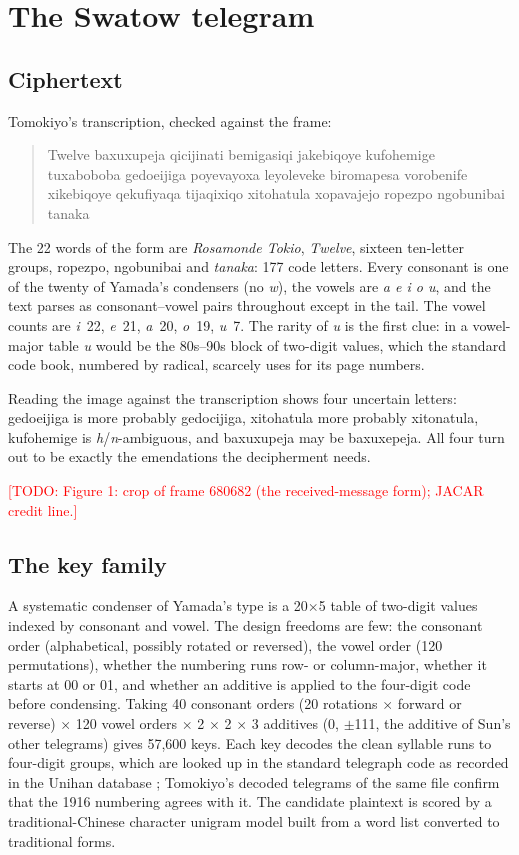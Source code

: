 \documentclass[11pt]{article}
\newcommand{\todo}[1]{\textcolor{red}{[TODO: #1]}}
\newcommand{\ct}[1]{\textsf{#1}}
\begin{document}
\section{The Swatow telegram}\label{sec:swatow}

\subsection{Ciphertext}

Tomokiyo's transcription, checked against the frame:

\begin{quote}\small\ct{Twelve baxuxupeja qicijinati bemigasiqi jakebiqoye kufohemige tuxaboboba gedoeijiga poyevayoxa leyoleveke biromapesa vorobenife xikebiqoye qekufiyaqa tijaqixiqo xitohatula xopavajejo ropezpo ngobunibai tanaka}
\end{quote}

The 22 words of the form are \emph{Rosamonde Tokio}, \emph{Twelve}, sixteen ten-letter groups, \ct{ropezpo}, \ct{ngobunibai} and \emph{tanaka}: 177 code letters. Every consonant is one of the twenty of Yamada's condensers (no \emph{w}), the vowels are \emph{a e i o u}, and the text parses as consonant--vowel pairs throughout except in the tail. The vowel counts are \emph{i}~22, \emph{e}~21, \emph{a}~20, \emph{o}~19, \emph{u}~7. The rarity of \emph{u} is the first clue: in a vowel-major table \emph{u} would be the 80s--90s block of two-digit values, which the standard code book, numbered by radical, scarcely uses for its page numbers.

Reading the image against the transcription shows four uncertain letters: \ct{gedoeijiga} is more probably \ct{gedocijiga}, \ct{xitohatula} more probably \ct{xitonatula}, \ct{kufohemige} is \emph{h}/\emph{n}-ambiguous, and \ct{baxuxupeja} may be \ct{baxuxepeja}. All four turn out to be exactly the emendations the decipherment needs.

\todo{Figure 1: crop of frame 680682 (the received-message form); JACAR credit line.}

\subsection{The key family}

A systematic condenser of Yamada's type is a 20$\times$5 table of two-digit values indexed by consonant and vowel. The design freedoms are few: the consonant order (alphabetical, possibly rotated or reversed), the vowel order (120 permutations), whether the numbering runs row- or column-major, whether it starts at 00 or 01, and whether an additive is applied to the four-digit code before condensing. Taking 40 consonant orders (20 rotations $\times$ forward or reverse) $\times$ 120 vowel orders $\times$ 2 $\times$ 2 $\times$ 3 additives (0, $\pm$111, the additive of Sun's other telegrams) gives 57,600 keys. Each key decodes the clean syllable runs to four-digit groups, which are looked up in the standard telegraph code as recorded in the Unihan database \cite{Unihan}; Tomokiyo's decoded telegrams of the same file confirm that the 1916 numbering agrees with it. The candidate plaintext is scored by a traditional-Chinese character unigram model built from a word list converted to traditional forms.
\end{document}
